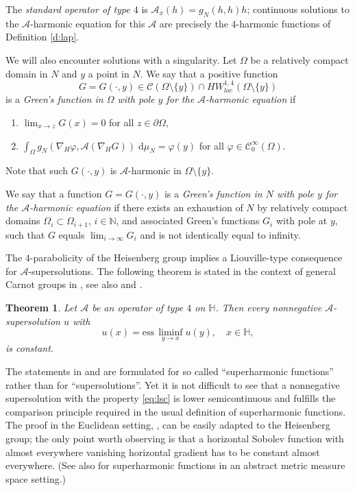 \documentclass[10pt,letterpaper]{amsart}
\newtheorem{thm}{Theorem}
\theoremstyle{definition}
\numberwithin{thm}{subsection}
\numberwithin{equation}{section}
\begin{document}
The {\it standard operator of type $4$} is ${\mathcal A}_x(h) = g_N(h,h)h$;
continuous solutions to the $\mathcal A$-harmonic equation for this $\mathcal A$ are precisely the $4$-harmonic functions of Definition \ref{d:lap}.

We will also encounter solutions with a singularity. Let $\Omega$
be a relatively compact domain in $N$ and $y$ a point in $N$. We
say that a positive function
\begin{displaymath}
G=G(\cdot,y)\in \mathcal{C}(\Omega \setminus \{y\})\cap
HW_{loc}^{1,4}(\Omega \setminus \{y\})
\end{displaymath}
is a \emph{Green's function in $\Omega$ with pole $y$ for the
$\mathcal{A}$-harmonic equation} if
\begin{enumerate}
\item $\lim_{x\to z}G(x)=0$ for all $z\in \partial \Omega$, \item
$\int_{\Omega} g_N(\nabla_H \varphi,\mathcal{A}(\nabla_H
G))\;\mathrm{d}\mu_N = \varphi(y)$ for all $\varphi \in
\mathcal{C}_0^{\infty}(\Omega)$.
\end{enumerate}
Note that such $G(\cdot,y)$ is $\mathcal{A}$-harmonic in $\Omega
\setminus \{y\}$.

We say that a function $G=G(\cdot,y)$ is a \emph{Green's function
in $N$ with pole $y$ for the $\mathcal{A}$-harmonic equation} if
there exists an exhaustion of $N$ by relatively compact domains
$\Omega_i \subset \Omega_{i+1}$, $i\in \mathbb{N}$, and associated
Green's functions $G_i$ with pole at $y$, such that $G$ equals
$\lim_{i\to \infty}G_i$ and is not identically equal to infinity.

The $4$-parabolicity of the Heisenberg group implies a
Liouville-type consequence for ${\mathcal A}$-supersolutions. The
following theorem is stated in the context of general Carnot
groups in \cite[p.\ 131]{MR1630785}, see also \cite[\S
3.2]{MR1878317} and \cite[Theorem 4]{MR1672629}.

\begin{thm}\label{t:parab_equiv0}
Let $\mathcal A$ be an operator of type $4$ on ${\mathbb H}$. Then every
nonnegative
$\mathcal A$-supersolution $u$ with
\begin{equation}\label{eq:lsc}
u(x)=\mathrm{ess}\,\liminf_{y\to x}u(y),\quad x\in {\mathbb H},
\end{equation}
is constant.
\end{thm}

The statements in \cite{MR1630785} and \cite{MR1672629}
are formulated for so called ``superharmonic functions'' rather
than for ``supersolutions''. Yet it is not difficult to see that a
nonnegative supersolution with the property \eqref{eq:lsc} is
lower semicontinuous and fulfills the comparison principle
required in the usual definition of superharmonic functions. The
proof in the Euclidean setting, \cite[Theorem 7.16]{MR1207810},
can be easily adapted to the  Heisenberg group; the only point
worth observing is that a horizontal Sobolev function with almost
everywhere vanishing horizontal gradient has to be constant almost
everywhere. (See also \cite[Proposition 9.4]{MR2867756} for
superharmonic functions in an abstract metric measure space
setting.)
\end{document}
